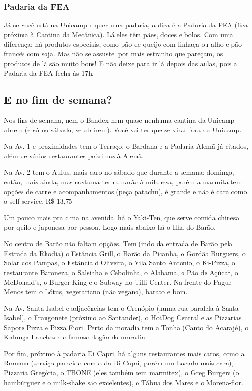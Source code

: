 \subsubsection{Padaria da FEA}

Já se você está na Unicamp e quer uma padaria, a dica é a Padaria da FEA (fica
próxima à Cantina da Mecânica). Lá eles têm pães, doces e bolos. Com uma
diferença: há produtos especiais, como pão de queijo com linhaça ou alho e pão
francês com soja. Mas não se assuste: por mais estranho que pareçam, os produtos
de lá são muito bons! E não deixe para ir lá depois das aulas, pois a Padaria da
FEA fecha às 17h.

\subsection{E no fim de semana?}

Nos fins de semana, nem o Bandex nem quase nenhuma cantina da Unicamp abrem (e
só no sábado, se abrirem). Você vai ter que se virar fora da Unicamp.

Na Av. 1 e proximidades tem o Terraço, o Bardana e a Padaria Alemã já citados,
além de vários restaurantes próximos à Alemã.

Na Av. 2 tem o Aulus, mais caro no sábado que durante a semana; domingo, então,
mais ainda, mas costuma ter camarão à milanesa; porém a marmita tem opções de
carne e acompanhamentos (peça patachu), é grande e não é cara como o
self-service, R\$ 13,75

Um pouco mais pra cima na avenida, há o Yaki-Ten, que serve comida chinesa por quilo e
japonesa por pessoa.  Logo mais abaixo há o Ilha do Barão.

No centro de Barão não faltam opções. Tem (indo da entrada de Barão pela Estrada
da Rhodia) o Estância Grill, o Barão da Picanha, o Gordão Burguers, o Solar dos
Pampas, o Estância d'Oliveira, o Vila Santo Antonio, o Ki-Pizza, o restaurante
Baroneza, o Salsinha e Cebolinha, o Alabama, o Pão de Açúcar, o McDonald's, o Burger King e
o Subway no Tilli Center. Na frente do Pague Menos tem o Lótus, vegetariano (não vegano),
barato e bom.

Na Av.  Santa Isabel e adjacências tem o Cronópio (numa rua paralela à Santa
Isabel), o Frangonete (próximo ao Santander), o HotDog Central e as Pizzarias
Sapore Pizza e Pizza Fiori. Perto da moradia tem a Tonha (Canto do Acarajé), o
Kalunga Lanches e o famoso dogão da moradia.

Por fim, próximo à padaria Di Capri, há alguns restaurantes mais caros, como a
Romana (serviço parecido com o da Di Capri, porém um bocado mais cara), Pizzaria
Gregória, o TBONE (eles também tem marmitex), o Greg Burgers (o hambúrguer e o
milk-shake são excelentes), o Tábua dos Mares e o Morena-flor.

